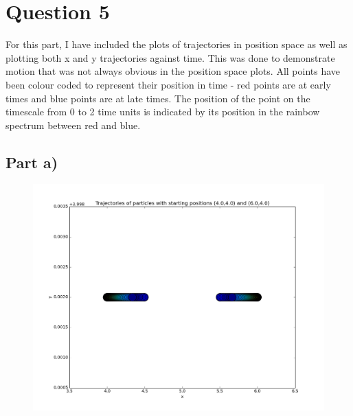 \documentclass[a4paper,12pt]{article}
\begin{document}
\section{Question 5}

For this part, I have included the plots of trajectories in position space as well as plotting both x and y trajectories against time. This was done to demonstrate motion that was not always obvious in the position space plots. All points have been colour coded to represent their position in time - red points are at early times and blue points are at late times. The position of the point on the timescale from 0 to 2 time units is indicated by its position in the rainbow spectrum between red and blue. 

\subsection{Part a)}
\begin{figure}[H]
\centering
\includegraphics[width = \linewidth]{lab6q5a.png}
\caption{}
\label{fig:q5a}
\end{figure}
\end{document}
